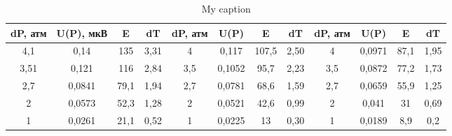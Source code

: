 \documentclass[a4paper,12pt]{article} %
\begin{document}
\begin{table}[!h]\centering
	\begin{tabular}{cccc|cccc|cccc}
		\toprule
		dP, атм & U(P), мкВ & E    & dT   & dP, атм & U(P)   & E     & dT   & dP, атм & U(P)   & E    & dT          \\\midrule
		4,1     & 0,14      & 135  & 3,31 & 4       & 0,117  & 107,5 & 2,50 & 4       & 0,0971 & 87,1 & 1,95 \\
		3,51    & 0,121     & 116  & 2,84 & 3,5     & 0,1052 & 95,7  & 2,23 & 3,5     & 0,0872 & 77,2 & 1,73 \\
		2,7     & 0,0841    & 79,1 & 1,94 & 2,7     & 0,0781 & 68,6  & 1,59 & 2,7     & 0,0659 & 55,9 & 1,25 \\
		2       & 0,0573    & 52,3 & 1,28 & 2       & 0,0521 & 42,6  & 0,99 & 2       & 0,041  & 31   & 0,69 \\
		1       & 0,0261    & 21,1 & 0,52 & 1       & 0,0225 & 13    & 0,30 & 1       & 0,0189 & 8,9  & 0,2  \\
		\bottomrule      
	\end{tabular}
\caption{My caption}
\label{main_table}
\end{table}
\end{document}
